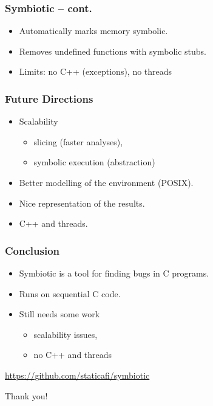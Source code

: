 \documentclass[sans]{beamer}
\begin{document}
\begin{frame}
\frametitle{Symbiotic -- cont.}
\begin{itemize}
  \item Automatically marks memory symbolic.
  \item Removes undefined functions with symbolic stubs.
  \item Limits: no C++ (exceptions), no threads
\end{itemize}
\end{frame}

\begin{frame}
\frametitle{Future Directions}
\begin{itemize}
  \item Scalability
  \begin{itemize}
    \item slicing (faster analyses),
    \item symbolic execution (abstraction)
  \end{itemize}
  \item Better modelling of the environment (POSIX).
  \item Nice representation of the results.
  \item C++ and threads.
\end{itemize}
\end{frame}

\begin{frame}
\frametitle{Conclusion}
\begin{itemize}
  \item Symbiotic is a tool for finding bugs in C programs.
  \item Runs on sequential C code.
  \item Still needs some work
  \begin{itemize}
    \item scalability issues,
    \item no C++ and threads
  \end{itemize}
\end{itemize}

\pause
\bigskip
\begin{center}
\url{https://github.com/staticafi/symbiotic}
\end{center}
\bigskip
\hfill Thank you!


\end{frame}
\end{document}
